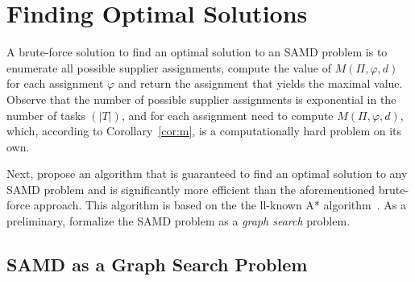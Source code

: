 \documentclass[letterpaper]{article} %
\newtheorem{conjecture}{Conjecture}
\newcommand{\samd}{\ac{SAMD}\xspace}
\newcommand{\astar}{\textsc{A*}\xspace}
\begin{document}


\section{Finding Optimal Solutions}\label{sec:opt}




A brute-force solution to find an optimal solution to an \samd problem is to enumerate all possible supplier assignments,
compute the value of $M(\Pi,\varphi, d)$ for each assignment $\varphi$ and return the assignment that yields the maximal value. Observe that the number of possible supplier assignments is exponential in the number of tasks $(|T|)$, and for each assignment  need to compute $M(\Pi, \varphi, d)$, which, according to Corollary~\ref{cor:m}, is a computationally hard problem on its own.





Next,  propose an algorithm that is guaranteed to find an optimal solution to any \samd problem and is significantly more efficient than the aforementioned brute-force approach. This algorithm is based on the the ll-known \astar algorithm~\cite{hart1968formal}. As a preliminary,  formalize the \samd problem as a \emph{graph search} problem.


\subsection{\samd as a Graph Search Problem}
\label{sec:graph}
\end{document}
